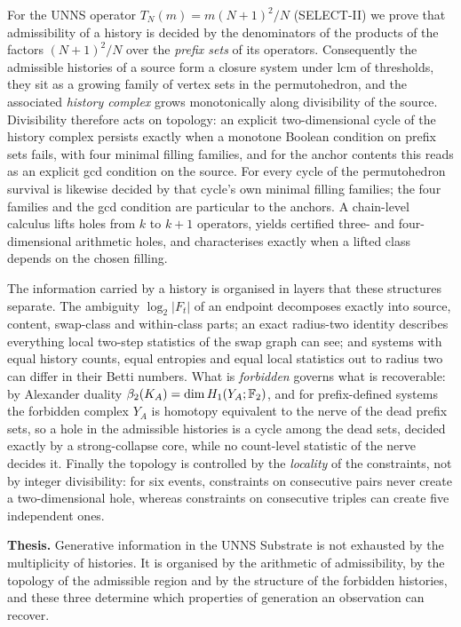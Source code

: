 For the UNNS operator $T_N(m)=m(N{+}1)^2/N$ (SELECT-II) we prove that admissibility of a history is decided by the denominators of the products of the factors $(N{+}1)^2/N$ over the \emph{prefix sets} of its operators. Consequently the admissible histories of a source form a closure system under lcm of thresholds, they sit as a growing family of vertex sets in the permutohedron, and the associated \emph{history complex} grows monotonically along divisibility of the source. Divisibility therefore acts on topology: an explicit two-dimensional cycle of the history complex persists exactly when a monotone Boolean condition on prefix sets fails, with four minimal filling families, and for the anchor contents this reads as an explicit gcd condition on the source. For every cycle of the permutohedron survival is likewise decided by that cycle's own minimal filling families; the four families and the gcd condition are particular to the anchors. A chain-level calculus lifts holes from $k$ to $k{+}1$ operators, yields certified three- and four-dimensional arithmetic holes, and characterises exactly when a lifted class depends on the chosen filling.

The information carried by a history is organised in layers that these structures separate. The ambiguity $\log_2|F_t|$ of an endpoint decomposes exactly into source, content, swap-class and within-class parts; an exact radius-two identity describes everything local two-step statistics of the swap graph can see; and systems with equal history counts, equal entropies and equal local statistics out to radius two can differ in their Betti numbers. What is \emph{forbidden} governs what is recoverable: by Alexander duality $\beta_2(K_A)=\dim H_1(Y_A;\mathbb{F}_2)$, and for prefix-defined systems the forbidden complex $Y_A$ is homotopy equivalent to the nerve of the dead prefix sets, so a hole in the admissible histories is a cycle among the dead sets, decided exactly by a strong-collapse core, while no count-level statistic of the nerve decides it. Finally the topology is controlled by the \emph{locality} of the constraints, not by integer divisibility: for six events, constraints on consecutive pairs never create a two-dimensional hole, whereas constraints on consecutive triples can create five independent ones.

\bigskip\noindent\textbf{Thesis.} Generative information in the UNNS Substrate is not exhausted by the multiplicity of histories. It is organised by the arithmetic of admissibility, by the topology of the admissible region and by the structure of the forbidden histories, and these three determine which properties of generation an observation can recover.
\begingroup\small\tableofcontents\endgroup
\mainmatter
